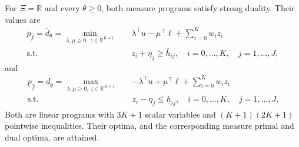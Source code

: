 \begin{theorem}
  \label{thm-finite-dual-reformulations}
  For $\Xi=\mathbb R$ and every $\theta\ge0$, both measure programs satisfy strong duality. Their values are
  \begin{equation}
    \begin{aligned}
      \overline p_{\hat f}=\overline d_\theta
      =\min_{\lambda,\mu\ge0,\ z\in\mathbb R^{K+1}}\quad&
      \lambda^\top u-\mu^\top\ell+\sum_{i=0}^K w_i z_i\\
      \text{s.t.}\quad&z_i+\eta_j\ge\overline h_{ij},
      \quad i=0,\ldots,K,\quad j=1,\ldots,J,
    \end{aligned}
    \label{eq-finite-upper-dual}
  \end{equation}
  and
  \begin{equation}
    \begin{aligned}
      \underline p_{\hat f}=\underline d_\theta
      =\max_{\lambda,\mu\ge0,\ z\in\mathbb R^{K+1}}\quad&
      -\lambda^\top u+\mu^\top\ell+\sum_{i=0}^K w_i z_i\\
      \text{s.t.}\quad&z_i-\eta_j\le\underline h_{ij},
      \quad i=0,\ldots,K,\quad j=1,\ldots,J.
    \end{aligned}
    \label{eq-finite-lower-dual}
  \end{equation}
  Both are linear programs with $3K+1$ scalar variables and $(K+1)(2K+1)$ pointwise inequalities. Their optima, and the corresponding measure primal and dual optima, are attained.
\end{theorem}
